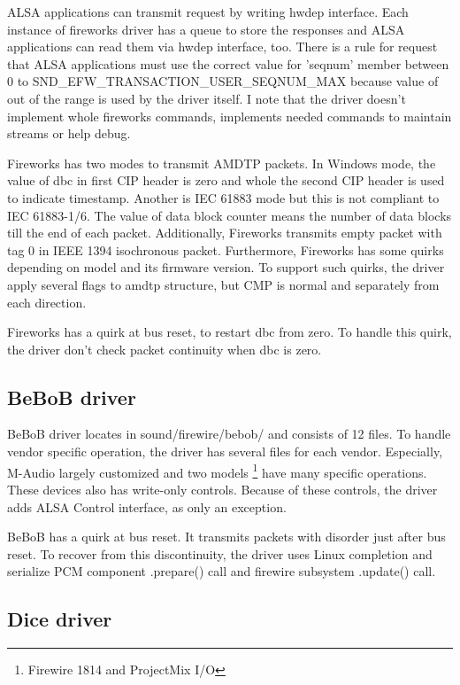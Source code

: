 \documentclass[onecolumn]{article}
\begin{document}
ALSA applications can transmit request by writing hwdep interface. Each instance of fireworks driver has a queue to store the responses and ALSA applications can read them via hwdep interface, too. There is a rule for request that ALSA applications must use the correct value for 'seqnum' member between 0 to SND\_EFW\_TRANSACTION\_USER\_SEQNUM\_MAX because value of out of the range is used by the driver itself. I note that the driver doesn't implement whole fireworks commands, implements needed commands to maintain streams or help debug.

Fireworks has two modes to transmit AMDTP packets. In Windows mode, the value of dbc in first CIP header is zero and whole the second CIP header is used to indicate timestamp. Another is IEC 61883 mode but this is not compliant to IEC 61883-1/6. The value of data block counter means the number of data blocks till the end of each packet. Additionally, Fireworks transmits empty packet with tag 0 in IEEE 1394 isochronous packet. Furthermore, Fireworks has some quirks depending on model and its firmware version. To support such quirks, the driver apply several flags to amdtp structure, but CMP is normal and separately from each direction.

Fireworks has a quirk at bus reset, to restart dbc from zero. To handle this quirk, the driver don't check packet continuity when dbc is zero.

\subsection{BeBoB driver}

BeBoB driver locates in sound/firewire/bebob/ and consists of 12 files. To handle vendor specific operation, the driver has several files for each vendor. Especially, M-Audio largely customized and two models \footnote{Firewire 1814 and ProjectMix I/O} have many specific operations. These devices also has write-only controls. Because of these controls, the driver adds ALSA Control interface, as only an exception.

BeBoB has a quirk at bus reset. It transmits packets with disorder just after bus reset. To recover from this discontinuity, the driver uses Linux completion and serialize PCM component .prepare() call and firewire subsystem .update() call.

\subsection{Dice driver}
\end{document}
